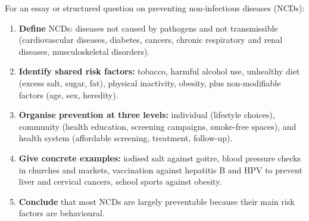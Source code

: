 \documentclass[11pt]{article}
\begin{document}
\begin{methode}
For an essay or structured question on preventing non-infectious diseases (NCDs):
\begin{enumerate}
\item \textbf{Define} NCDs: diseases not caused by pathogens and not transmissible (cardiovascular diseases, diabetes, cancers, chronic respiratory and renal diseases, musculoskeletal disorders).
\item \textbf{Identify shared risk factors:} tobacco, harmful alcohol use, unhealthy diet (excess salt, sugar, fat), physical inactivity, obesity, plus non-modifiable factors (age, sex, heredity).
\item \textbf{Organise prevention at three levels:} individual (lifestyle choices), community (health education, screening campaigns, smoke-free spaces), and health system (affordable screening, treatment, follow-up).
\item \textbf{Give concrete examples:} iodised salt against goitre, blood pressure checks in churches and markets, vaccination against hepatitis B and HPV to prevent liver and cervical cancers, school sports against obesity.
\item \textbf{Conclude} that most NCDs are largely preventable because their main risk factors are behavioural.
\end{enumerate}
\end{methode}
\end{document}
